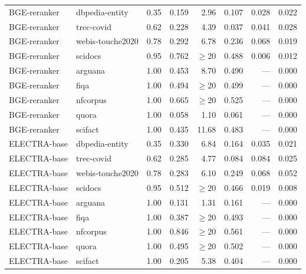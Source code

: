 \documentclass[sn-mathphys-num,pdflatex]{sn-jnl}
\begin{document}
\begin{appendices}
\begin{table}[h!]
\begin{tabular}{llrrrrrr}
\midrule
\rowcolor{cleangreen}
BGE-reranker   & dbpedia-entity   & 0.35 & 0.159 & 2.96 & 0.107 & 0.028 & 0.022 \\
\rowcolor{cleangreen}
BGE-reranker   & trec-covid       & 0.62 & 0.228 & 4.39 & 0.037 & 0.041 & 0.028 \\
\rowcolor{cleangreen}
BGE-reranker   & webis-touche2020 & 0.78 & 0.292 & 6.78 & 0.236 & 0.068 & 0.019 \\
\rowcolor{cleangreen}
BGE-reranker   & scidocs          & 0.95 & 0.762 & $\geq$20 & 0.488 & 0.006 & 0.012 \\
\rowcolor{singleclasspink}
BGE-reranker   & arguana          & 1.00 & 0.453 & 8.70 & 0.490 & --- & 0.000 \\
\rowcolor{singleclasspink}
BGE-reranker   & fiqa             & 1.00 & 0.494 & $\geq$20 & 0.499 & --- & 0.000 \\
\rowcolor{singleclasspink}
BGE-reranker   & nfcorpus         & 1.00 & 0.665 & $\geq$20 & 0.525 & --- & 0.000 \\
\rowcolor{singleclasspink}
BGE-reranker   & quora            & 1.00 & 0.058 & 1.10 & 0.061 & --- & 0.000 \\
\rowcolor{singleclasspink}
BGE-reranker   & scifact          & 1.00 & 0.435 & 11.68 & 0.483 & --- & 0.000 \\
\midrule
\rowcolor{cleangreen}
ELECTRA-base   & dbpedia-entity   & 0.35 & 0.330 & 6.84 & 0.164 & 0.035 & 0.021 \\
\rowcolor{cleangreen}
ELECTRA-base   & trec-covid       & 0.62 & 0.285 & 4.77 & 0.084 & 0.084 & 0.025 \\
\rowcolor{cleangreen}
ELECTRA-base   & webis-touche2020 & 0.78 & 0.283 & 6.10 & 0.249 & 0.068 & 0.052 \\
\rowcolor{cleangreen}
ELECTRA-base   & scidocs          & 0.95 & 0.512 & $\geq$20 & 0.466 & 0.019 & 0.008 \\
\rowcolor{singleclasspink}
ELECTRA-base   & arguana          & 1.00 & 0.131 & 1.31 & 0.161 & --- & 0.000 \\
\rowcolor{singleclasspink}
ELECTRA-base   & fiqa             & 1.00 & 0.387 & $\geq$20 & 0.493 & --- & 0.000 \\
\rowcolor{singleclasspink}
ELECTRA-base   & nfcorpus         & 1.00 & 0.846 & $\geq$20 & 0.561 & --- & 0.000 \\
\rowcolor{singleclasspink}
ELECTRA-base   & quora            & 1.00 & 0.495 & $\geq$20 & 0.502 & --- & 0.000 \\
\rowcolor{singleclasspink}
ELECTRA-base   & scifact          & 1.00 & 0.205 & 5.38 & 0.404 & --- & 0.000 \\
\bottomrule
\end{tabular}
\end{table}

\end{appendices}
\end{document}
